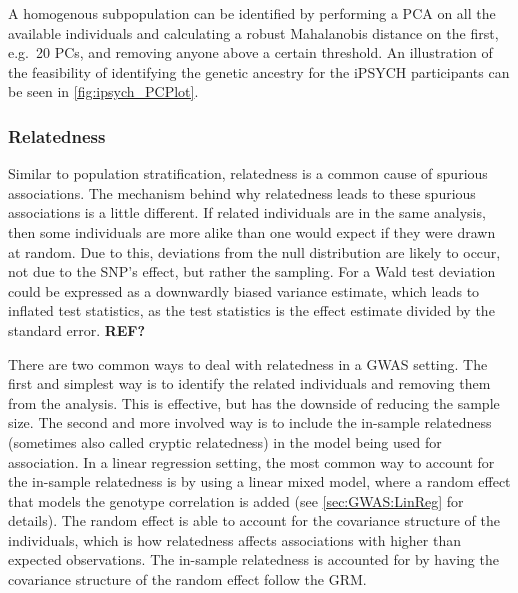 A homogenous subpopulation can be identified by performing a PCA on all the 
available individuals and calculating a robust Mahalanobis distance on the 
first, e.g.\ 20 PCs, and removing anyone above a certain 
threshold\cite{prive2020efficient}. An illustration of the feasibility of 
identifying the genetic ancestry for the iPSYCH participants can be seen in 
\cref{fig:ipsych_PCPlot}.

\subsubsection{Relatedness}
Similar to population stratification, relatedness is a common cause of spurious associations. The mechanism behind why relatedness leads to these spurious associations is a little different. If related individuals are in the same analysis, then some individuals are more alike than one would expect if they were drawn at random. Due to this, deviations from the null distribution are likely to occur, not due to the SNP's effect, but rather the sampling. For a Wald test deviation could be expressed as a downwardly biased variance estimate, which leads to inflated test statistics, as the test statistics is the effect estimate divided by the standard error. \textbf{REF?}

There are two common ways to deal with relatedness in a GWAS setting. The first 
and simplest way is to identify the related individuals and removing them from 
the analysis. This is effective, but has the downside of reducing the sample 
size. The second and more involved way is to include the in-sample relatedness 
(sometimes also called cryptic relatedness) in the model being used for 
association. In a linear regression setting, the most common way to account for 
the in-sample relatedness is by using a linear mixed model, where a random 
effect that models the genotype correlation is added (see 
\cref{sec:GWAS:LinReg} 
for details). The random 
effect is able to account for the covariance structure of the individuals, 
which is how relatedness affects associations with higher than expected 
observations\cite{yu2006unified, kang2008efficient}. The in-sample relatedness 
is accounted for by having the covariance structure of the random effect follow 
the GRM.

